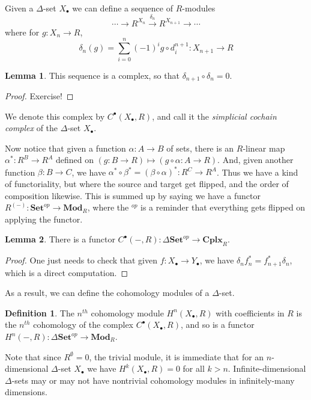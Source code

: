 \documentclass{tufte-handout}
\def\Set {\mathbf{Set}}
\def\Mod {\mathbf{Mod}}
\def\Cplx{\mathbf{Cplx}}
\theoremstyle{definition}
\newtheorem{lemma}{Lemma}
\newtheorem{definition}{Definition}
\begin{document}
Given a $\Delta$-set $X_\bullet$ we can define a sequence of $R$-modules 
\[
	\cdots \to R^{X_n} \xrightarrow{\delta_n} R^{X_{n+1}} \to \cdots
\]
where for $g\colon X_n\to R$, 
\[
	\delta_n(g) = \sum_{i=0}^n (-1)^ig\circ d_i^{n+1}\colon X_{n+1}\to R
\]

\begin{lemma}
This sequence is a complex, so that $\delta_{n+1}\circ \delta_n = 0$.
\end{lemma}

\begin{proof}
Exercise!
\end{proof}

We denote this complex by $C^\bullet(X_\bullet,R)$, and call it the \emph{simplicial cochain
complex} of the $\Delta$-set $X_\bullet$.

Now notice that given a function $\alpha\colon A\to B$ of sets, there is an $R$-linear map 
$\alpha^*\colon R^B\to R^A$ defined on $(g\colon B\to R)\mapsto (g\circ \alpha\colon A\to R)$. 
And, given another function $\beta\colon B\to C$, we have 
$\alpha^*\circ \beta^* = (\beta\circ \alpha)^*\colon R^C\to R^A$. Thus we have a kind of 
functoriality, but where the source and target get flipped, and the order of composition likewise. 
This is summed up by saying we have a functor $R^{(-)}\colon \Set^{op}\to \Mod_R$, where the 
${}^{op}$ is a reminder that everything gets flipped on applying the functor.

\begin{lemma}
There is a functor $C^\bullet(-,R)\colon \Delta\Set^{op}\to \Cplx_R$.
\end{lemma}

\begin{proof}
One just needs to check that given $f\colon X_\bullet \to Y_\bullet$, we have 
$\delta_nf_n^* = f_{n+1}^*\delta_n$, which is a direct computation.
\end{proof}

As a result, we can define the cohomology modules of a $\Delta$-set.

\begin{definition}
The $n^{th}$ cohomology module $H^n(X_\bullet,R)$ with coefficients in $R$ is the $n^{th}$ cohomology
of the complex $C^\bullet(X_\bullet,R)$, and so is a functor $H^n(-,R)\colon \Delta\Set^{op}\to \Mod_R$.
\end{definition}

Note that since $R^\emptyset = 0$, the trivial module, it is immediate that for an 
$n$-dimensional $\Delta$-set $X_\bullet$ we have $H^k(X_\bullet,R) = 0$ for all $k>n$. 
Infinite-dimensional $\Delta$-sets may or may not have nontrivial cohomology modules in 
infinitely-many dimensions. 
\end{document}
